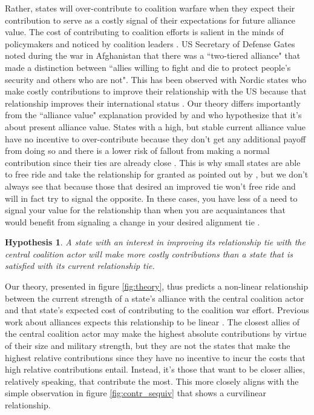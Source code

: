 \documentclass[12pt,letterpaper]{article}
\newtheorem{hyp}{Hypothesis}
\begin{document}
		Rather, states will over-contribute to coalition warfare when they expect their contribution to serve as a costly signal of their expectations for future alliance value. The cost of contributing to coalition efforts is salient in the minds of policymakers and noticed by coalition leaders \citep{ringsmose_natoburdensharingredux_2010}. US Secretary of Defense Gates noted during the war in Afghanistan that there was a ``two-tiered alliance" that made a distinction between ``allies willing to fight and die to protect people's security and others who are not". This has been observed with Nordic states who make costly contributions to improve their relationship with the US because that relationship improves their international status \citep{pedersen_bandwagonstatuschanging_2018}. Our theory differs importantly from the ``alliance value" explanation provided by \citet{davidson_americaallieswar_2011} and \citet{massie_democraticalliesfollowership_2016} who hypothesize that it's about present alliance value. States with a high, but stable current alliance value have no incentive to over-contribute because they don't get any additional payoff from doing so and there is a lower risk of fallout from making a normal contribution since their ties are already close \citep{davidson_headingexitsdemocratic_2014}. This is why small states are able to free ride and take the relationship for granted as pointed out by \citet{keohane_biginfluencesmall_1971}, but we don't always see that because those that desired an improved tie won't free ride and will in fact try to signal the opposite. In these cases, you have less of a need to signal your value for the relationship than when you are acquaintances that would benefit from signaling a change in your desired alignment tie \citep{gartzke_contractsfriendsalliances_2012, gibler_priorcommitmentscompatible_2004}.

		\begin{hyp}
			A state with an interest in improving its relationship tie with the central coalition actor will make more costly contributions than a state that is satisfied with its current relationship tie.
		\end{hyp}

		Our theory, presented in figure \ref{fig:theory}, thus predicts a non-linear relationship between the current strength of a state's alliance with the central coalition actor and that state's expected cost of contributing to the coalition war effort. Previous work about alliances expects this relationship to be linear \citep{massie_democraticalliesfollowership_2016, haesebrouck_explainingmemberstates_2016, ringsmose_natoburdensharingredux_2010}. The closest allies of the central coalition actor may make the highest absolute contributions by virtue of their size and military strength, but they are not the states that make the highest relative contributions since they have no incentive to incur the costs that high relative contributions entail. Instead, it's those that want to be closer allies, relatively speaking, that contribute the most. This more closely aligns with the simple observation in figure \ref{fig:contr_sequiv} that shows a curvilinear relationship.
\end{document}

